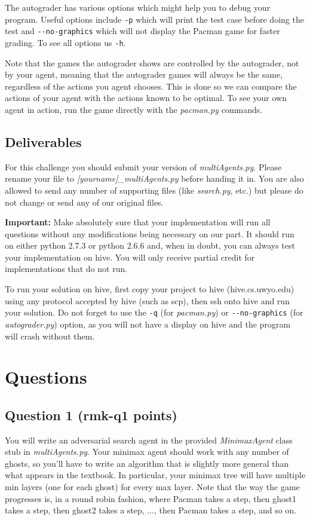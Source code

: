\documentclass{article}
\newcommand{\points}[1]{\csname rmk-#1\endcsname}
\begin{document}
The autograder has various options which might help you to debug your program. Useful options include \texttt{-p} which will print the test case before doing the test and \texttt{-{}-no-graphics} which will not display the Pacman game for faster grading. To see all options us \texttt{-h}.

Note that the games the autograder shows are controlled by the autograder, not by your agent, meaning that the autograder games will always be the same, regardless of the actions you agent chooses. This is done so we can compare the actions of your agent with the actions known to be optimal. To see your own agent in action, run the game directly with the \emph{pacman.py} commands.

\subsection{Deliverables}
For this challenge you should submit your version of \emph{multiAgents.py}. Please rename your file to \emph{[yourname]\_multiAgents.py} before handing it in. You are also allowed to send any number of supporting files (like \emph{search.py}, etc.) but please do not change or send any of our original files.

\textbf{Important:} Make absolutely sure that your implementation will run all questions without any modifications being necessary on our part. It should run on either python 2.7.3 or python 2.6.6 and, when in doubt, you can always test your implementation on hive. You will only receive partial credit for implementations that do not run.

To run your solution on hive, first copy your project to hive (hive.cs.uwyo.edu) using any protocol accepted by hive (such as scp), then ssh onto hive and run your solution. Do not forget to use the \texttt{-q} (for \emph{pacman.py}) or \texttt{-{}-no-graphics} (for \emph{autograder.py}) option, as you will not have a display on hive and the program will crash without them.

\section{Questions}

\subsection{Question 1 (\points{q1} points)} 
You will write an adversarial search agent in the provided \emph{MinimaxAgent} class stub in \emph{multiAgents.py}. Your minimax agent should work with any number of ghosts, so you'll have to write an algorithm that is slightly more general than what appears in the textbook. In particular, your minimax tree will have multiple min layers (one for each ghost) for every max layer. Note that the way the game progresses is, in a round robin fashion, where Pacman takes a step, then ghost1 takes a step, then ghost2 takes a step, ..., then Pacman takes a step, and so on.
\end{document}
